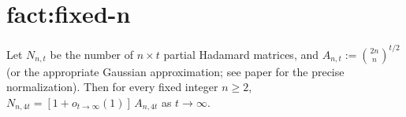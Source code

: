 \chapter{fact:fixed-n}\label{chap:fact_fixed_n}
\begin{lemma}
\label{fact:fixed-n}
Let $N_{n,t}$ be the number of $n \times t$ partial Hadamard matrices, and
$A_{n,t} := \binom{2n}{n}^{t/2}$ (or the appropriate Gaussian
approximation; see paper for the precise normalization). Then for every
fixed integer $n \ge 2$, $N_{n,4t} = [1 + o_{t\to\infty}(1)]\,A_{n,4t}$
as $t \to \infty$.
\end{lemma}
